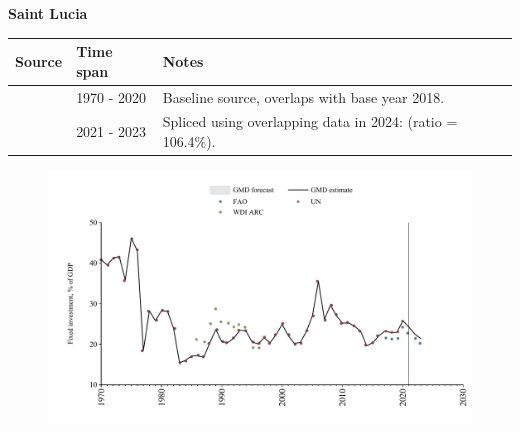 \documentclass[12pt,a4paper,landscape]{article}
\begin{document}
\begin{adjustbox}{max totalsize={\paperwidth}{\paperheight},center}
\begin{minipage}[t][\textheight][t]{\textwidth}
\vspace*{0.5cm}
{}
\begin{center}
{\Large\bfseries Saint Lucia}
\end{center}
\vspace{0.5cm}
\begin{table}[H]
\centering
\small
\begin{tabular}{|l|l|l|}
\hline
\textbf{Source} & \textbf{Time span} & \textbf{Notes} \\
\hline
\rowcolor{white}\cite{UN}& 1970 - 2020 &Baseline source, overlaps with base year 2018.\\
\rowcolor{lightgray}\cite{FAO}& 2021 - 2023 &Spliced using overlapping data in 2024: (ratio = 106.4\%).\\
\hline
\end{tabular}
\end{table}
\begin{figure}[H]
\centering
\includegraphics[width=\textwidth,height=0.6\textheight,keepaspectratio]{graphs/LCA_finv_GDP.pdf}
\end{figure}
\end{minipage}
\end{adjustbox}
\end{document}
